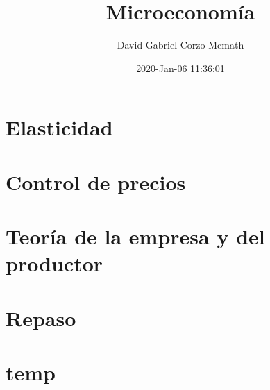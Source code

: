 \documentclass[openany]{book}
\title{Microeconomía}
\author{David Gabriel Corzo Mcmath}
\date{2020-Jan-06 11:36:01}
\begin{document}
\maketitle
\tableofcontents

\chapter{Elasticidad}



\chapter{Control de precios}




\chapter{Teoría de la empresa y del productor}



\chapter{Repaso}



\chapter{temp}

\end{document}
